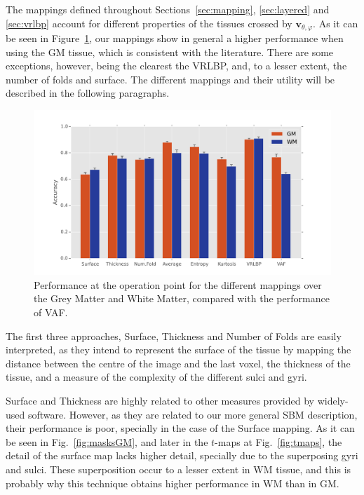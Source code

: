 The mappings defined throughout Sections~\ref{sec:mapping}, \ref{sec:layered} and \ref{sec:vrlbp} account for different properties of the tissues crossed by $\mathbf{v}_{\theta,\varphi}$. As it can be seen in Figure~\ref{fig:performance}, our mappings show in general a higher performance when using the \ac{GM} tissue, which is consistent with the literature. There are some exceptions, however, being the clearest the VRLBP, and, to a lesser extent, the number of folds and surface. The different mappings and their utility will be described in the following paragraphs. 

\begin{figure}[htp]
	\centering
	\includegraphics[width=0.9\columnwidth]{Graphics/ch6/12-performance}
	\caption{Performance at the operation point for the different mappings over the Grey Matter and White Matter, compared with the performance of \ac{VAF}.}
	\label{fig:performance}
\end{figure}

The first three approaches, Surface, Thickness and Number of Folds are easily interpreted, as they intend to represent the surface of the tissue by mapping the distance between the centre of the image and the last voxel, the thickness of the tissue, and a measure of the complexity of the different sulci and gyri. 

Surface and Thickness are highly related to other measures provided by widely-used software. However, as they are related to our more general \ac{SBM} description, their performance is poor, specially in the case of the Surface mapping. As it can be seen in Fig.~\ref{fig:masksGM}, and later in the $t$-maps at Fig.~\ref{fig:tmaps}, the detail of the surface map lacks higher detail, specially due to the superposing gyri and sulci. These superposition occur to a lesser extent in \ac{WM} tissue, and this is probably why this technique obtains higher performance in \ac{WM} than in \ac{GM}. 

